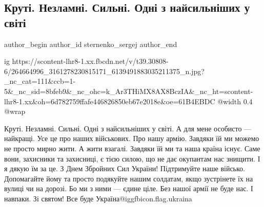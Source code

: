  
 
 
 
 
 
\subsection{Круті. Незламні. Сильні. Одні з найсильніших у світі}
\label{sec:06_12_2021.fb.sternenko_sergej.1.vsu}
 
\ifcmt
 author_begin
   author_id sternenko_sergej
 author_end
\fi

\ifcmt
  ig https://scontent-lhr8-1.xx.fbcdn.net/v/t39.30808-6/264664996_3161278230815171_6139491883035211375_n.jpg?_nc_cat=111&ccb=1-5&_nc_sid=8bfeb9&_nc_ohc=k_Ar3THiMX8AX8BczIA&_nc_ht=scontent-lhr8-1.xx&oh=6d782759ffafe446826850eb67e2018e&oe=61B4EBDC
  @width 0.4
  @wrap 
\fi

\obeycr
Круті. Незламні. Сильні. Одні з найсильніших у світі. А для мене особисто — найкращі. 
Усе це про наших військових. 
Про нашу армію.
Завдяки їй ми можемо не просто мирно жити. А жити взагалі. 
Завдяки їй ми та наша країна існує. 
Саме вони, захисники та захисниці, є тією силою, що не дає окупантам нас знищити. 
І я дякую їм за це. 
З Днем Збройних Сил України!
Підтримуйте наше військо. Допомагайте йому та просто подякуйте нашим солдатам, якщо зустрінете їх на вулиці чи на дорозі.
Бо ми з ними — єдине ціле. 
Без нашої армії не буде нас. 
І навпаки. 
Зі святом!
Все буде Україна@igg{fbicon.flag.ukraina}
\restorecr

